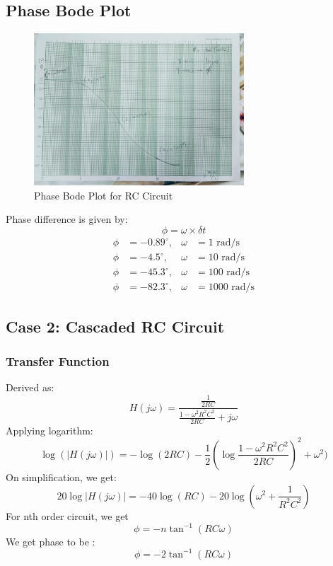 \documentclass[a4paper,12pt]{article}
\begin{document}
\subsection{Phase Bode Plot}
\begin{figure}[H]
    \centering
    \includegraphics[width=0.7\textwidth]{fig/pbd1.jpeg} %
    \caption{Phase Bode Plot for RC Circuit}
\end{figure}
Phase difference is given by:
$$\phi = \omega \times \delta t$$
\begin{align}
\phi &= -0.89^\circ, & \omega &= 1 \text{ rad/s} \\
\phi &= -4.5^\circ, & \omega &= 10 \text{ rad/s} \\
\phi &= -45.3^\circ, & \omega &= 100 \text{ rad/s} \\
\phi &= -82.3^\circ, & \omega &= 1000 \text{ rad/s}
\end{align}

\subsection{Case 2: Cascaded RC Circuit}
\subsubsection{Transfer Function}
Derived as:
\begin{equation}
    H(j\omega) = \frac{\frac{1}{2RC}}{ \frac{1-\omega^2R^2C^2}{2RC}+j\omega}
\end{equation}
Applying logarithm:
\begin{equation}
 \log(|H(j\omega)|)=-\log(2RC) -\frac{1}{2}(\log\frac{1-\omega^2R^2C^2}{2RC})^2+\omega^2)
\end{equation}
On simplification, we get:
\begin{equation}
20\log \left| H(j\omega) \right|=-40\log(RC) -20\log(\omega^2+\frac{1}{R^2C^2})
\end{equation}
For nth order circuit, we get 
\begin{equation}
    \phi = -n\tan^{-1}(RC\omega)
\end{equation}
We get phase to be :
\begin{equation}
    \phi =-2\tan^{-1}(RC\omega)
\end{equation}
\end{document}
